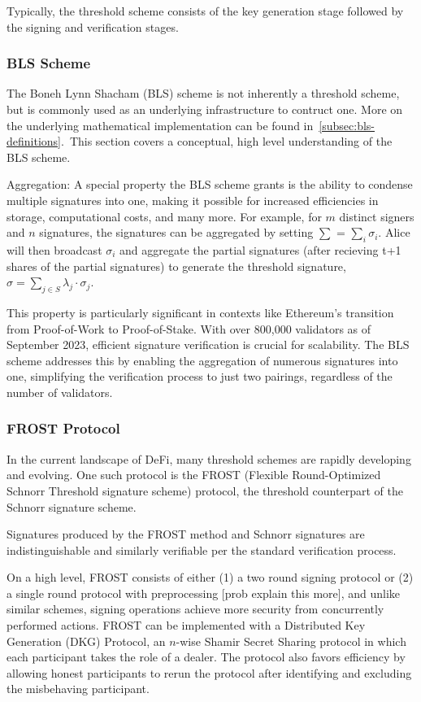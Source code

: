 \documentclass[12pt]{article}
\begin{document}
Typically, the threshold scheme consists of the key generation stage followed by the signing and verification stages. 

\subsubsection{BLS Scheme}

The Boneh Lynn Shacham (BLS) scheme is not inherently a threshold scheme, but is commonly used as an underlying infrastructure to contruct one. More on the underlying mathematical implementation can be found in~\ref{subsec:bls-definitions}.\ This section covers a conceptual, high level understanding of the BLS scheme.

Aggregation: A special property the BLS scheme grants is the ability to condense multiple signatures into one, making it possible for increased efficiencies in storage, computational costs, and many more. For example, for \(m\) distinct signers and \(n\) signatures, the signatures can be aggregated by setting \( \sum \) = \( \sum_i \)\( \sigma_i \). Alice will then broadcast \( \sigma_i \) and aggregate the partial signatures (after recieving t+1 shares of the partial signatures) to generate the threshold signature, \( \sigma = \sum_{j \in S} \lambda_j \cdot \sigma_j \).

This property is particularly significant in contexts like Ethereum's transition from Proof-of-Work to Proof-of-Stake. With over 800,000 validators as of September 2023, efficient signature verification is crucial for scalability. The BLS scheme addresses this by enabling the aggregation of numerous signatures into one, simplifying the verification process to just two pairings, regardless of the number of validators.

\subsubsection{FROST Protocol}
In the current landscape of DeFi, many threshold schemes are rapidly developing and evolving. One such protocol is the FROST (Flexible Round-Optimized Schnorr Threshold signature scheme) protocol, the threshold counterpart of the Schnorr signature scheme. 

Signatures produced by the FROST method and Schnorr signatures are indistinguishable and similarly verifiable per the standard verification process.  

On a high level, FROST consists of either (1) a two round signing protocol or (2) a single round protocol with preprocessing [prob explain this more], and unlike similar schemes, signing operations achieve more security from concurrently performed actions. FROST can be implemented with a Distributed Key Generation (DKG) Protocol, an \(n\)-wise Shamir Secret Sharing protocol in which each participant takes the role of a dealer. The protocol also favors efficiency by allowing honest participants to rerun the protocol after identifying and excluding the misbehaving participant. 
\end{document}
